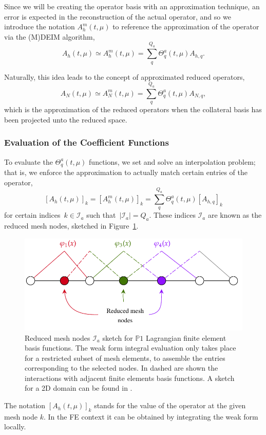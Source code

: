 \documentclass[../../thesis.tex]{subfiles}
\begin{document}
Since we will be creating the operator basis with an approximation technique, 
an error is expected in the reconstruction of the actual operator, 
and so we introduce the notation $A_h^m(t, \mu)$ to reference the approximation of the operator via the (M)DEIM algorithm,
\begin{equation}
    \label{eq:1d_rom_burgers_system_approximation}
    A_h(t, \mu) \simeq A_h^m(t, \mu) = \sum_q^{Q_a} \Theta_q^a(t, \mu) A_{h,q}.
\end{equation}

Naturally, this idea leads to the concept of approximated reduced operators,
\begin{equation}
    A_N(t, \mu) \simeq A_N^m(t, \mu) = \sum_q^{Q_a} \Theta_q^a(t, \mu) A_{N,q},
\end{equation}
which is the approximation of the reduced operators when the collateral basis 
has been projected unto the reduced space.

\subsubsection{Evaluation of the Coefficient Functions}
To evaluate the $\Theta_q^a(t, \mu)$ functions, we set and solve an interpolation problem;
that is, we enforce the approximation to actually match certain entries of the operator, 
\begin{equation}
    \label{eq:1d_rom_burgers_interpolation_problem}
    [A_h(t, \mu)]_{k} = [A_h^m(t, \mu)]_{k} = \sum_q^{Q_a} \Theta_q^a(t, \mu) [A_{h, q}]_{k}
\end{equation}
for certain indices~$k \in \mathcal{I}_a$ such that~$\left|\mathcal{I}_a\right| = Q_a$.
These indices $\mathcal{I}_a$ are known as the reduced mesh nodes, 
sketched in Figure~\ref{fig:reduced_mesh}.
\begin{figure}[h]
    \centering
    \includegraphics[width=0.90\columnwidth]{research_project/piston/figures/reduced_mesh_nodes.pdf}
    \caption{Reduced mesh nodes $\mathcal{I}_a$ sketch 
    for $\mathbb{P}1$ Lagrangian finite element basis functions. 
    The weak form integral evaluation only takes place for a restricted subset of mesh elements,
    to assemble the entries corresponding to the selected nodes.  
    In dashed are shown the interactions with adjacent finite elements basis functions.
    A sketch for a 2D domain can be found in \cite{2015_efficientModelReductionParametrizedSystemsMatrixDeim_Negri}.}
    \label{fig:reduced_mesh}
\end{figure}
The notation $[A_h(t, \mu)]_{k}$ stands for the value of the operator at the given mesh node $k$.
In the FE context it can be obtained by integrating the weak form locally.
\end{document}
